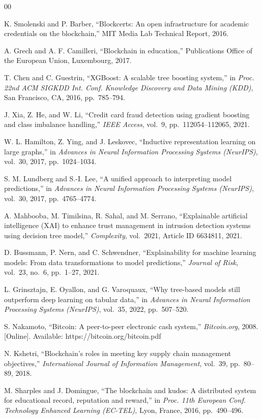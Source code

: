 \documentclass[conference]{IEEEtran}
\begin{document}
\begin{thebibliography}{00}

K. Smolenski and P. Barber, ``Blockcerts: An open infrastructure
for academic credentials on the blockchain,'' MIT Media Lab
Technical Report, 2016.

A. Grech and A. F. Camilleri, ``Blockchain in education,''
Publications Office of the European Union, Luxembourg, 2017.

T. Chen and C. Guestrin, ``XGBoost: A scalable tree boosting
system,'' in \textit{Proc. 22nd ACM SIGKDD Int. Conf. Knowledge
Discovery and Data Mining (KDD)}, San Francisco, CA, 2016,
pp.\ 785--794.

J. Xia, Z. He, and W. Li, ``Credit card fraud detection using
gradient boosting and class imbalance handling,''
\textit{IEEE Access}, vol.\ 9, pp.\ 112054--112065, 2021.

W. L. Hamilton, Z. Ying, and J. Leskovec, ``Inductive representation
learning on large graphs,'' in \textit{Advances in Neural
Information Processing Systems (NeurIPS)}, vol.\ 30, 2017,
pp.\ 1024--1034.

S. M. Lundberg and S.-I. Lee, ``A unified approach to interpreting
model predictions,'' in \textit{Advances in Neural Information
Processing Systems (NeurIPS)}, vol.\ 30, 2017, pp.\ 4765--4774.

A. Mahbooba, M. Timilsina, R. Sahal, and M. Serrano,
``Explainable artificial intelligence (XAI) to enhance trust
management in intrusion detection systems using decision tree
model,'' \textit{Complexity}, vol.\ 2021, Article ID 6634811, 2021.

D. Bussmann, P. Nern, and C. Schwendner, ``Explainability for
machine learning models: From data transformations to model
predictions,'' \textit{Journal of Risk}, vol.\ 23, no.\ 6,
pp.\ 1--27, 2021.

L. Grinsztajn, E. Oyallon, and G. Varoquaux, ``Why tree-based
models still outperform deep learning on tabular data,'' in
\textit{Advances in Neural Information Processing Systems
(NeurIPS)}, vol.\ 35, 2022, pp.\ 507--520.

S. Nakamoto, ``Bitcoin: A peer-to-peer electronic cash system,''
\textit{Bitcoin.org}, 2008. [Online]. Available:
https://bitcoin.org/bitcoin.pdf

N. Kshetri, ``Blockchain's roles in meeting key supply chain
management objectives,'' \textit{International Journal of
Information Management}, vol.\ 39, pp.\ 80--89, 2018.

M. Sharples and J. Domingue, ``The blockchain and kudos: A
distributed system for educational record, reputation and reward,''
in \textit{Proc. 11th European Conf. Technology Enhanced Learning
(EC-TEL)}, Lyon, France, 2016, pp.\ 490--496.

\end{thebibliography}
\end{document}

